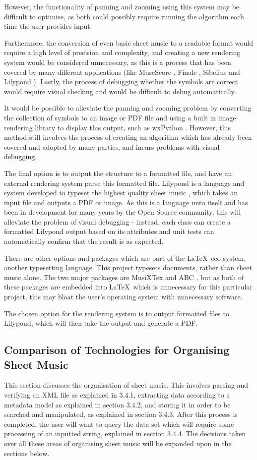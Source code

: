However, the functionality of panning and zooming using this system may be difficult to optimise, as both could possibly require running the algorithm each time the user provides input. 

Furthermore, the conversion of even basic sheet music to a readable format would require a high level of precision and complexity, and creating a new rendering system would be considered unnecessary, as this is a process that has been covered by many different applications (like MuseScore \parencite{MuseTour}, Finale \parencite{mxml}, Sibelius \parencite{avid} and Lilypond \parencite{Lilypond}). 
Lastly, the process of debugging whether the symbols are correct would require visual checking and would be difficult to debug automatically.

It would be possible to alleviate the panning and zooming problem by converting the collection of symbols to an image or PDF file and using a built in image rendering library to display this output, such as wxPython \parencite{WX}. However, this method still involves the process of creating an algorithm which has already been covered and adopted by many parties, and incurs problems with visual debugging.

The final option is to output the structure to a formatted file, and have an external rendering system parse this formatted file. Lilypond is a language and system developed to typeset the highest quality sheet music \parencite{Lilypond}, which takes an input file and outputs a PDF or image. As this is a language unto itself and has been in development for many years by the Open Source community, this will alleviate the problem of visual debugging - instead, each class can create a formatted Lilypond output based on its attributes and unit tests can automatically confirm that the result is as expected.

There are other options and packages which are part of the \LaTeX\  
 eco system, another typesetting language. This project typesets documents, rather than sheet music alone. The two major packages are MusiXTex and ABC \parencite{musixtex}, but as both of these packages are embedded into \LaTeX\
 which is unnecessary for this particular project, this may bloat the user's operating system with unnecessary software.

The chosen option for the rendering system is to output formatted files to Lilypond, which will then take the output and generate a PDF.

\subsection{Comparison of Technologies for Organising Sheet Music}
This section discusses the organisation of sheet music. This involves parsing and verifying an XML file as explained in 3.4.1, extracting data according to a metadata model as explained in section 3.4.2, and storing it in order to be searched and manipulated, as explained in section 3.4.3. After this process is completed, the user will want to query the data set which will require some processing of an inputted string, explained in section 3.4.4. The decisions taken over all these areas of organising sheet music will be expanded upon in the sections below.
